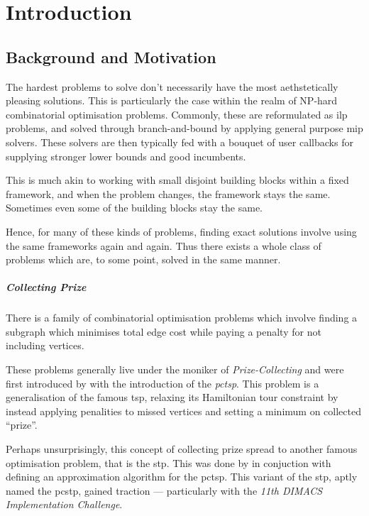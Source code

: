 \chapter{Introduction}
\section{Background and Motivation}\label{sec:intro:background}
The hardest problems to solve don't necessarily have the most aethstetically pleasing solutions.
This is particularly the case within the realm of NP-hard combinatorial optimisation problems.
Commonly, these are reformulated as \gls{ilp} problems, and solved through
branch-and-bound
by applying general purpose
\gls{mip} solvers. These solvers are then typically
fed with a bouquet of user callbacks for supplying
stronger lower bounds and good incumbents.

This is much akin to working with small disjoint building blocks
within a fixed framework, and when the problem changes, the framework stays
the same. Sometimes even some of the building blocks stay the same.

Hence, for many of these kinds of problems, finding exact solutions
involve using the same frameworks again and again.
Thus there exists a whole class of problems which are, to some point,
solved in the same manner.

\paragraph{Collecting Prize}
There is a family of combinatorial optimisation problems which involve
finding a subgraph which minimises total edge cost while paying a penalty
for not including vertices.

These problems generally live under the moniker of \textit{Prize-Collecting}
and were first introduced by \citet*{balas1989prize}
with the introduction of the \textit{\gls{pctsp}}. This problem is a generalisation of
the famous \gls{tsp}, relaxing its Hamiltonian tour constraint by instead applying penalities
to missed vertices and setting a minimum on collected ``prize''.

Perhaps unsurprisingly, this concept of collecting prize spread to another famous optimisation
problem, that is the \gls{stp}. This was done by \citet{Bienstock1993} in conjuction with
defining an approximation algorithm for the \gls{pctsp}. This variant of the \gls{stp},
aptly named the \gls{pcstp}, gained traction --- particularly with the
\textit{11th DIMACS Implementation Challenge}\citep{DIMACS}.

